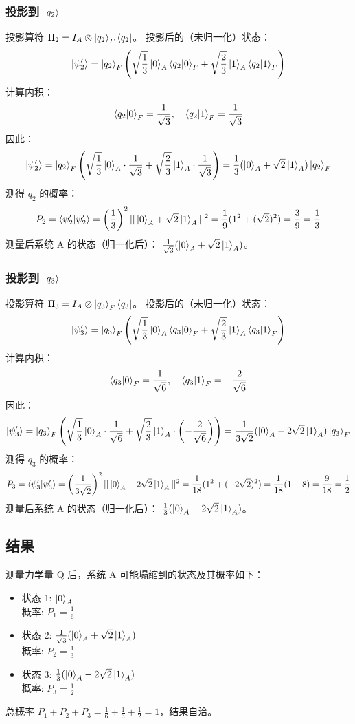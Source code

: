 \documentclass[12pt, a4paper]{article}
\begin{document}
\subsubsection*{投影到 \(\ket{q_2}\)}
投影算符 \(\Pi_2 = I_A \otimes \ket{q_2}_F\bra{q_2}\)。
投影后的（未归一化）状态：
\[ \ket{\psi'_2} = \ket{q_2}_F \left( \sqrt{\frac{1}{3}}\ket{0}_A \braket{q_2|0}_F + \sqrt{\frac{2}{3}}\ket{1}_A \braket{q_2|1}_F \right) \]
计算内积：
\[ \braket{q_2|0}_F = \frac{1}{\sqrt{3}}, \quad \braket{q_2|1}_F = \frac{1}{\sqrt{3}} \]
因此：
\[ \ket{\psi'_2} = \ket{q_2}_F \left( \sqrt{\frac{1}{3}}\ket{0}_A \cdot \frac{1}{\sqrt{3}} + \sqrt{\frac{2}{3}}\ket{1}_A \cdot \frac{1}{\sqrt{3}} \right) = \frac{1}{3} (\ket{0}_A + \sqrt{2}\ket{1}_A) \ket{q_2}_F \]
测得 \(q_2\) 的概率：
\[ P_2 = \braket{\psi'_2|\psi'_2} = \left(\frac{1}{3}\right)^2 || \ket{0}_A + \sqrt{2}\ket{1}_A ||^2 = \frac{1}{9} (1^2 + (\sqrt{2})^2) = \frac{3}{9} = \frac{1}{3} \]
测量后系统 A 的状态（归一化后）： \(\frac{1}{\sqrt{3}}(\ket{0}_A + \sqrt{2}\ket{1}_A)\)。

\subsubsection*{投影到 \(\ket{q_3}\)}
投影算符 \(\Pi_3 = I_A \otimes \ket{q_3}_F\bra{q_3}\)。
投影后的（未归一化）状态：
\[ \ket{\psi'_3} = \ket{q_3}_F \left( \sqrt{\frac{1}{3}}\ket{0}_A \braket{q_3|0}_F + \sqrt{\frac{2}{3}}\ket{1}_A \braket{q_3|1}_F \right) \]
计算内积：
\[ \braket{q_3|0}_F = \frac{1}{\sqrt{6}}, \quad \braket{q_3|1}_F = -\frac{2}{\sqrt{6}} \]
因此：
\[ \ket{\psi'_3} = \ket{q_3}_F \left( \sqrt{\frac{1}{3}}\ket{0}_A \cdot \frac{1}{\sqrt{6}} + \sqrt{\frac{2}{3}}\ket{1}_A \cdot \left(-\frac{2}{\sqrt{6}}\right) \right) = \frac{1}{3\sqrt{2}} (\ket{0}_A - 2\sqrt{2}\ket{1}_A) \ket{q_3}_F \]
测得 \(q_3\) 的概率：
\[ P_3 = \braket{\psi'_3|\psi'_3} = \left(\frac{1}{3\sqrt{2}}\right)^2 || \ket{0}_A - 2\sqrt{2}\ket{1}_A ||^2 = \frac{1}{18} (1^2 + (-2\sqrt{2})^2) = \frac{1}{18} (1 + 8) = \frac{9}{18} = \frac{1}{2} \]
测量后系统 A 的状态（归一化后）： \(\frac{1}{3}(\ket{0}_A - 2\sqrt{2}\ket{1}_A)\)。

\subsection*{结果}
测量力学量 Q 后，系统 A 可能塌缩到的状态及其概率如下：
\begin{itemize}
    \item 状态 1: \(\ket{0}_A\) \\
          概率: \(P_1 = \frac{1}{6}\)
    \item 状态 2: \(\frac{1}{\sqrt{3}}(\ket{0}_A + \sqrt{2}\ket{1}_A)\) \\
          概率: \(P_2 = \frac{1}{3}\)
    \item 状态 3: \(\frac{1}{3}(\ket{0}_A - 2\sqrt{2}\ket{1}_A)\) \\
          概率: \(P_3 = \frac{1}{2}\)
\end{itemize}
总概率 \(P_1 + P_2 + P_3 = \frac{1}{6} + \frac{1}{3} + \frac{1}{2} = 1\)，结果自洽。
\end{document}
